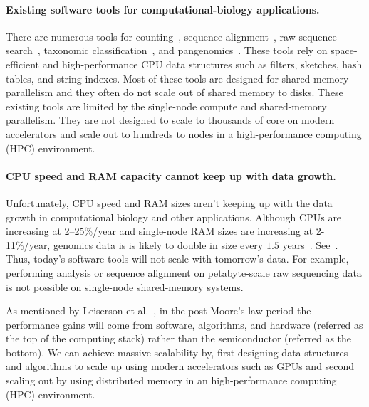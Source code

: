 \paragraph{Existing software tools for computational-biology applications.}

There are numerous tools for \kmer counting~\cite{MarccaisKi11,PandeyBJP17a}, sequence alignment~\cite{altschul1990basic,kielbasa2011adaptive,li2018minimap2,schwartz2003human}, raw sequence search~\cite{solomon2016fast,PandeyABFJP18Cell}, taxonomic classification~\cite{wood2014kraken,wood2019improved}, and pangenomics~\cite{garrison2018variation,pandey2021variantstore}. These tools rely on space-efficient and high-performance CPU data structures such as filters, sketches, hash tables, and string indexes. Most of these tools are designed for shared-memory parallelism and they often do not scale out of shared memory to disks.
These existing tools are limited by the single-node compute and shared-memory parallelism. They are not designed to scale to thousands of core on modern accelerators and scale out to hundreds to nodes in a high-performance computing (HPC) environment.
%


\label{sec:we-need-performance-and-scalability}
\paragraph{CPU speed and RAM capacity cannot keep up with data growth.}
Unfortunately, CPU speed and RAM sizes aren't keeping up with the data growth in computational biology and other applications.
Although CPUs are increasing at 2--25\%/year and single-node RAM sizes are increasing at 2-11\%/year, genomics data is is likely to double in size every $1.5$ years~\cite{kodama2012sequence}.
See~.
Thus, today's software tools will not scale with tomorrow's data. For example, performing \kmer analysis or sequence alignment on petabyte-scale raw sequencing data is not possible on single-node shared-memory systems.

As mentioned by Leiserson et al.~\cite{leiserson2020there}, in the post Moore’s law period the performance gains will come from software, algorithms, and hardware (referred as the top of the computing stack) rather than the semiconductor (referred as the bottom). We can achieve massive scalability by, first designing data structures and algorithms to scale up using modern accelerators such as GPUs and second scaling out by using distributed memory in an high-performance computing (HPC) environment.


